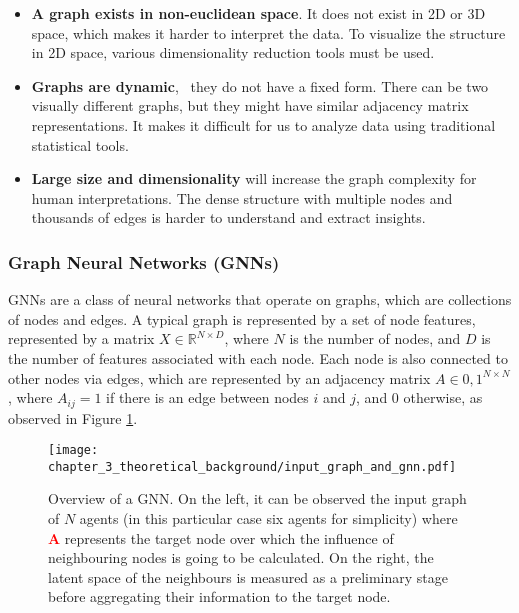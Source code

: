 \begin{itemize}
	
	\item \textbf{A graph exists in non-euclidean space}. It does not exist in 2D or 3D space, which makes it harder to interpret the data. To visualize the structure in 2D space, various dimensionality reduction tools must be used.
	
	\item \textbf{Graphs are dynamic}, \ie \ they do not have a fixed form. There can be two visually different graphs, but they might have similar adjacency matrix representations. It makes it difficult for us to analyze data using traditional statistical tools.
	
	\item \textbf{Large size and dimensionality} will increase the graph complexity for human interpretations. The dense structure with multiple nodes and thousands of edges is harder to understand and extract insights. 
	
\end{itemize}

\subsubsection{Graph Neural Networks (GNNs)}
\label{subsubsec:3_gnns}

\acfp{GNN} are a class of neural networks that operate on graphs, which are collections of nodes and edges. A typical graph is represented by a set of node features, represented by a matrix $X \in \mathbb{R}^{N \times D}$, where $N$ is the number of nodes, and $D$ is the number of features associated with each node. Each node is also connected to other nodes via edges, which are represented by an adjacency matrix $A \in {0,1}^{N \times N}$, where $A_{ij} = 1$ if there is an edge between nodes $i$ and $j$, and $0$ otherwise, as observed in Figure \ref{fig:chapter_3_theoretical_background/gnn}.

\begin{figure}[h]
	\centering
	\texttt{[image: chapter\_3\_theoretical\_background/input\_graph\_and\_gnn.pdf]}
	\captionsetup{justification=justified}
	\caption[Overview of a \ac{GNN}]{Overview of a \ac{GNN}. On the left, it can be observed the input graph of $N$ agents (in this particular case six agents for simplicity) where \textbf{\textcolor{red}{A}} represents the target node over which the influence of neighbouring nodes is going to be calculated. On the right, the latent space of the neighbours is measured as a preliminary stage before aggregating their information to the target node.}
	\label{fig:chapter_3_theoretical_background/gnn}
\end{figure}

